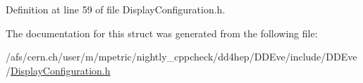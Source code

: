 Definition at line 59 of file DisplayConfiguration.h.

The documentation for this struct was generated from the following file:\begin{DoxyCompactItemize}
\item 
/afs/cern.ch/user/m/mpetric/nightly\_\-cppcheck/dd4hep/DDEve/include/DDEve/\hyperlink{_display_configuration_8h}{DisplayConfiguration.h}\end{DoxyCompactItemize}
